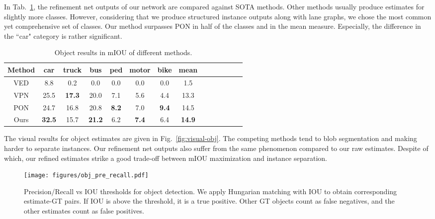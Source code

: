 \documentclass[10pt,twocolumn,letterpaper]{article}
\begin{document}
In Tab.~\ref{tab:object_results}, the refinement net outputs of our network are compared against SOTA methods. Other methods usually produce estimates for slightly more classes. However, considering that we produce structured instance outputs along with lane graphs, we chose the most common yet comprehensive set of classes. Our method surpasses PON in half of the classes and in the mean measure. Especially, the difference in the ``car" category is rather significant.
\begin{table}[ht]

\begin{center}
\scriptsize{
\begin{tabular}{ |c|c|c|c|c|c|c|c|c|c|c|c|c|c| }
\hline
Method &  car & truck & bus &   ped & motor & bike & mean\\
\hline

VED &  8.8 & 0.2 & 0.0 &  0.0&  0.0&0.0&  1.5 \\ 
VPN &  25.5 & \textbf{17.3} & 20.0 &   7.1& 5.6 & 4.4 & 13.3 \\ 
PON &  24.7 & 16.8 &
20.8 &  \textbf{8.2}& 7.0 &\textbf{9.4} &14.5 \\ 
Ours& \textbf{32.5} & 15.7 & \textbf{21.2} & 6.2 & \textbf{7.4} & 6.4  & \textbf{14.9}\\
\hline
\end{tabular}
}
\end{center}
\vspace{-.5em}
\caption{Object results in mIOU of different methods.}
\label{tab:object_results}
\end{table}

The visual results for object estimates are given in Fig.~\ref{fig:visual-obj}. The competing methods  tend to blob segmentation and making harder to separate instances. Our refinement net outputs also suffer from the same phenomenon compared to our raw estimates. Despite of which, our refined estimates strike a good trade-off between mIOU maximization and instance separation.



\begin{figure}
    \centering
    \texttt{[image: figures/obj\_pre\_recall.pdf]}
    \caption{Precision/Recall vs IOU thresholds for object detection. We apply Hungarian matching with IOU to obtain corresponding estimate-GT pairs. If IOU is above the threshold, it is a true positive. Other GT objects count as false negatives, and the other estimates count as false positives.}
    \label{fig:obj-pre-recall}
    \vspace{-1em}
\end{figure}
\end{document}
